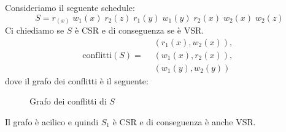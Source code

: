 \documentclass[a4paper]{article}
\begin{document}
\begin{Example}{}{}
Consideriamo il seguente schedule:
\[
  S = r_(x) \; w_1(x) \; r_2(z) \; r_1(y) \; w_1(y) \; r_2(x) \; w_2(x) \; w_2(z )
\]
Ci chiediamo se $S$ è CSR e di conseguenza se è VSR.
\[
  \text{conflitti}(S) = \begin{aligned}
    &(r_1(x), w_2(x)),\\
    &(w_1(x), r_2(x)),\\
    &(w_1(y), w_2(y))
  \end{aligned}
\]
dove il grafo dei conflitti è il seguente:
\begin{figure}[H]
  \centering
  \caption{Grafo dei conflitti di \( S \)}
\end{figure}
\noindent
Il grafo è acilico e quindi $S_1$ è CSR e di conseguenza è anche VSR.
\end{Example}
\end{document}
